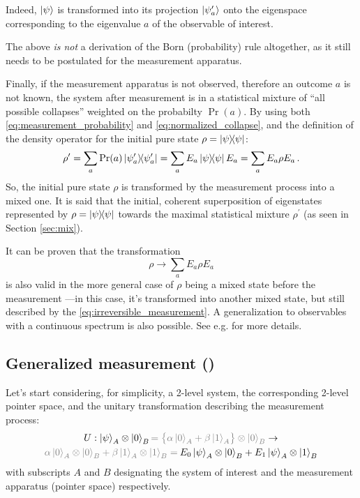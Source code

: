 Indeed,
$\ket{\psi}$
is transformed
into its projection $\ket{\psi^\prime_a}$
onto the eigenspace
corresponding to the eigenvalue $a$ of the observable of interest.

The above \emph{is not} a derivation of the Born (probability) rule altogether,
as it still needs to be postulated for the measurement apparatus.

Finally, if the measurement apparatus is not observed,
therefore an outcome $a$ is not known,
the system after measurement is in a statistical mixture
of ``all possible collapses'' weighted on the probabilty $\Pr(a)$.
By using both \eqref{eq:measurement_probability} and \eqref{eq:normalized_collapse},
and the definition of the density operator for the initial pure state
$\rho = \ketbra{\psi}$:
\[
  \rho^{\prime} = \sum_a \Pr(a) \ketbra{\psi^{\prime}_a} = \sum_a E_a \ketbra{\psi} E_a
    = \sum_a E_a \rho E_a \,\text{.}
\]
So, the initial pure state $\rho$ is transformed by the measurement process into a mixed one.
It is said that the initial, coherent superposition of eigenstates represented by $\rho = \ketbra{\psi}$
 towards the maximal statistical mixture $\rho^{\prime}$
(as seen in Section \ref{sec:mix}).

It can be proven that the transformation
\begin{equation}\label{eq:irreversible_measurement}
  \rho \rightarrow \sum_a E_a \rho E_a
\end{equation}
is also valid in the more general case of $\rho$ being a mixed state before the measurement
---in this case, it's transformed into another mixed state,
but still described by the \eqref{eq:irreversible_measurement}.
A generalization to observables with a continuous spectrum is also possible.
See e.g. \cite[Section 3.1.1]{PreskillNotes} for more details.


\subsection{Generalized measurement ()}

Let's start considering, for simplicity, a 2-level system,
the corresponding 2-level pointer space,
and the unitary transformation describing the measurement process:
\begin{multline}\label{eq:qubit_ortho_measurement}
  U:
    \ket{\psi}_A \ox \ket{0}_B
    {\color{gray}= \qty\big{\alpha\ket{0}_A + \beta\ket{1}_A} \ox \ket{0}_B}
  \rightarrow \\
    {\color{gray}\alpha\ket{0}_A \ox \ket{0}_B + \beta\ket{1}_A  \ox \ket{1}_B =}
    \:
    E_0\ket{\psi}_A \ox \ket{0}_B + E_1\ket{\psi}_A \ox \ket{1}_B
\end{multline}
with subscripts $A$ and $B$ designating the system of interest and
the measurement apparatus (pointer space) respectively.

